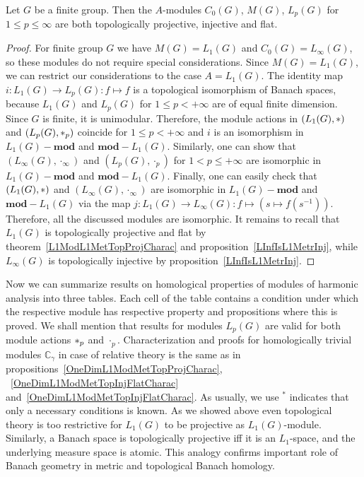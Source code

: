 \begin{proposition}\label{StdModFinGrL1MGTopInjProjFlatCharac} Let $G$ be a
finite group. Then the $A$-modules $C_0(G)$, $M(G)$, $L_p(G)$ 
for $1\leq p\leq \infty$ are both topologically projective, injective and flat.
\end{proposition} 
\begin{proof}
For finite group $G$ we have $M(G)=L_1(G)$ and $C_0(G)=L_\infty(G)$, so these
modules do not require special considerations. Since $M(G)=L_1(G)$, we can
restrict our considerations to the case $A=L_1(G)$. The identity map
$i:L_1(G)\to L_p(G):f\mapsto f$ is a topological isomorphism of Banach spaces,
because $L_1(G)$ and $L_p(G)$ for $1\leq p<+\infty$ are of equal finite
dimension. Since $G$ is finite, it is unimodular. Therefore, the module actions
in $(L_1(G),\ast)$ and $(L_p(G),\ast_p)$ coincide for $1\leq p<+\infty$
and $i$ is an isomorphism in $L_1(G)-\mathbf{mod}$ and $\mathbf{mod}-L_1(G)$.
Similarly, one can show that $(L_\infty(G),\cdot_\infty)$ and $(L_p(G),\cdot_p)$
for $1<p\leq+\infty$ are isomorphic in $L_1(G)-\mathbf{mod}$ and
$\mathbf{mod}-L_1(G)$. Finally, one can easily check that $(L_1(G),\ast)$ and
$(L_\infty(G),\cdot_\infty)$ are isomorphic in $L_1(G)-\mathbf{mod}$ and
$\mathbf{mod}-L_1(G)$ via the 
map $j:L_1(G)\to L_\infty(G):f\mapsto(s\mapsto f(s^{-1}))$. Therefore, all 
the discussed modules are isomorphic. It remains to
recall that $L_1(G)$ is topologically projective and flat by
theorem~\ref{L1ModL1MetTopProjCharac} and proposition~\ref{LInfIsL1MetrInj},
while $L_\infty(G)$ is topologically injective by
proposition~\ref{LInfIsL1MetrInj}.
\end{proof}

Now we can summarize results on homological properties of modules of harmonic
analysis into three tables. Each cell of the table contains a condition under
which the respective module has respective property and propositions where this
is proved. We shall mention that results for modules $L_p(G)$ are valid for both
module actions $\ast_p$ and $\cdot_p$. Characterization and proofs for
homologically trivial modules $\mathbb{C}_\gamma$ in case of relative theory is
the same as in
propositions~\ref{OneDimL1ModMetTopProjCharac},
~\ref{OneDimL1ModMetTopInjFlatCharac}
and~\ref{OneDimL1ModMetTopInjFlatCharac}. As usually, we use ${}^{*}$
indicates that only a necessary conditions is known. As we showed above even
topological theory is too restrictive for $L_1(G)$ to be projective as
$L_1(G)$-module. Similarly, a Banach space is topologically projective iff it is
an $L_1$-space, and the underlying measure space is atomic. This analogy
confirms important role of Banach geometry in metric and topological Banach
homology.

